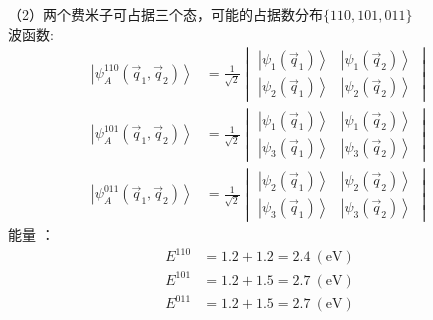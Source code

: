\begin{frame}[label=current]
  \frametitle{}
（2）两个费米子可占据三个态，可能的占据数分布$\{110, 101, 011\}$\\
波函数:
\[\begin{aligned}
  \left\vert \psi ^{110}_A(\vec{q}_1,\vec{q}_2) \right\rangle 
  &= \frac{1}{\sqrt{2}} \begin{vmatrix}\left\vert \psi _1(\vec{q}_1)\right\rangle  &\left\vert \psi _1(\vec{q}_2)\right\rangle \\ 
  \left\vert \psi _2(\vec{q}_1) \right\rangle & \left\vert \psi _2(\vec{q}_2)\right\rangle 
\end{vmatrix}  \\
\left\vert \psi ^{101}_A(\vec{q}_1,\vec{q}_2) \right\rangle 
  &= \frac{1}{\sqrt{2}} \begin{vmatrix}\left\vert \psi _1(\vec{q}_1)\right\rangle  &\left\vert \psi _1(\vec{q}_2)\right\rangle \\ 
  \left\vert \psi _3(\vec{q}_1) \right\rangle & \left\vert \psi _3(\vec{q}_2)\right\rangle 
\end{vmatrix}  \\
\left\vert \psi ^{011}_A(\vec{q}_1,\vec{q}_2) \right\rangle 
  &= \frac{1}{\sqrt{2}} \begin{vmatrix}\left\vert \psi _2(\vec{q}_1)\right\rangle  &\left\vert \psi _2(\vec{q}_2)\right\rangle \\ 
  \left\vert \psi _3(\vec{q}_1) \right\rangle & \left\vert \psi _3(\vec{q}_2)\right\rangle 
\end{vmatrix}  
\end{aligned} \]
能量 ：$$ \begin{aligned} E^{110} &= 1.2+1.2 = 2.4~ (\text{eV}) \\ 
  E^{101} &= 1.2+1.5 = 2.7~ (\text{eV}) \\
  E^{011} &= 1.2+1.5 = 2.7~ (\text{eV}) 
\end{aligned} $$
\end{frame}

